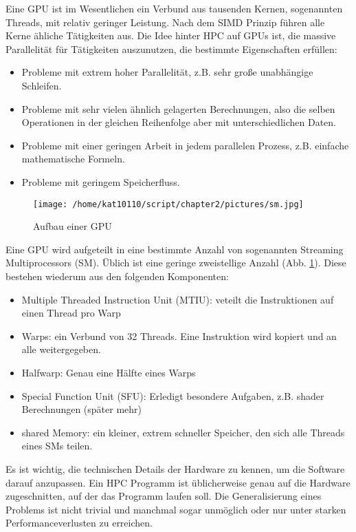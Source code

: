 		Eine GPU ist im Wesentlichen ein Verbund aus tausenden Kernen, sogenannten \Glspl{Thread}, mit relativ geringer Leistung. Nach dem SIMD Prinzip führen alle Kerne ähliche Tätigkeiten aus. Die Idee hinter HPC auf GPUs ist, die massive Parallelität für Tätigkeiten auszunutzen, die bestimmte Eigenschaften erfüllen:
		\begin{itemize}
			\item Probleme mit extrem hoher Parallelität, z.B. sehr große unabhängige Schleifen.
			\item Probleme mit sehr vielen ähnlich gelagerten Berechnungen, also die selben Operationen in der gleichen Reihenfolge aber mit unterschiedlichen Daten.
			\item Probleme mit einer geringen \Gls{Arbeit} in jedem parallelen Prozess, z.B. einfache mathematische Formeln.
			\item Probleme mit geringem Speicherfluss.			
		\end{itemize}
			
		\begin{figure}[h]
			\centering
    		\texttt{[image: /home/kat10110/script/chapter2/pictures/sm.jpg]}
    		\caption[GPU]{Aufbau einer GPU}
    		\label{2:gpu}
		\end{figure}
		
		Eine GPU wird aufgeteilt in eine bestimmte Anzahl von sogenannten Streaming Multiprocessors (\Gls{SM}). Üblich ist eine geringe zweistellige Anzahl (Abb. \ref{2:gpu}). Diese bestehen wiederum aus den folgenden Komponenten:
		
		\begin{itemize}
		\item Multiple Threaded Instruction Unit (\Gls{MTIU}): veteilt die Instruktionen auf einen \Gls{Thread} pro \Gls{Warp}
		\item \Glspl{Warp}: ein Verbund von 32 \Glspl{Thread}. Eine Instruktion wird kopiert und an alle weitergegeben.
		\item \Gls{Halfwarp}: Genau eine Hälfte eines \glspl{Warp}
		\item Special Function Unit (SFU): Erledigt besondere Aufgaben, z.B. shader Berechnungen (später mehr) 
		\item \Gls{shared Memory}: ein kleiner, extrem schneller Speicher, den sich alle \Glspl{Thread} eines \Gls{SM}s teilen.
		\end{itemize}

		Es ist wichtig, die technischen Details der Hardware zu kennen, um die Software darauf anzupassen. Ein HPC Programm ist üblicherweise genau auf die Hardware zugeschnitten, auf der das Programm laufen soll. Die Generalisierung eines Problems ist nicht trivial und manchmal sogar unmöglich oder nur unter starken \Gls{Performance}verlusten zu erreichen.	